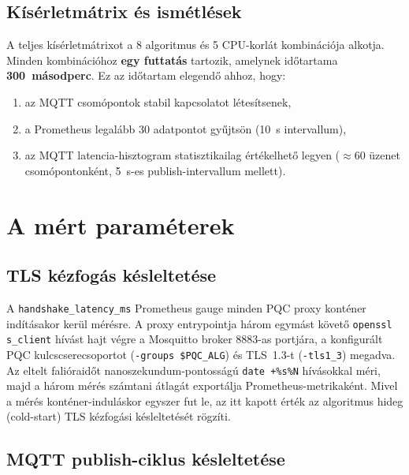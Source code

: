 \subsection{Kísérletmátrix és ismétlések}

A teljes kísérletmátrixot a 8 algoritmus és 5 CPU-korlát kombinációja alkotja. Minden kombinációhoz \textbf{egy futtatás} tartozik, amelynek időtartama
\textbf{300~másodperc}. Ez az időtartam elegendő ahhoz, hogy:
\begin{enumerate}
    \item az MQTT csomópontok stabil kapcsolatot létesítsenek,
    \item a Prometheus legalább 30 adatpontot gyűjtsön (10~s intervallum),
    \item az MQTT latencia-hisztogram statisztikailag értékelhető legyen
          ($\approx 60$ üzenet csomópontonként, 5~s-es publish-intervallum mellett).
\end{enumerate}

\section{A mért paraméterek}

\subsection{TLS kézfogás késleltetése}

A \texttt{handshake\_latency\_ms} Prometheus gauge minden PQC proxy konténer indításakor
kerül mérésre. A proxy entrypointja három egymást követő \texttt{openssl s\_client} hívást
hajt végre a Mosquitto broker 8883-as portjára, a konfigurált PQC kulcscserecsoportot
(\texttt{-groups \$PQC\_ALG}) és TLS~1.3-t (\texttt{-tls1\_3}) megadva. Az eltelt falióraidőt
nanoszekundum-pontosságú \texttt{date +\%s\%N} hívásokkal méri, majd a három mérés
számtani átlagát exportálja Prometheus-metrikaként. Mivel a mérés konténer-induláskor
egyszer fut le, az itt kapott érték az algoritmus hideg (cold-start) TLS kézfogási
késleltetését rögzíti.

\subsection{MQTT publish-ciklus késleltetése}

